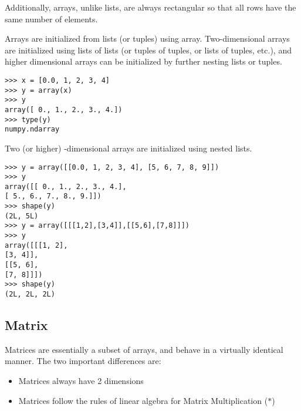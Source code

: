 \documentclass[KSmain.tex]{subfiles}
\begin{document}

Additionally, arrays, unlike lists, are always rectangular so that all rows have the same
number of elements.

Arrays are initialized from lists (or tuples) using array. Two-dimensional arrays are initialized using
lists of lists (or tuples of tuples, or lists of tuples, etc.), and higher dimensional arrays can be initialized by
further nesting lists or tuples.

\begin{framed}
\begin{verbatim}
>>> x = [0.0, 1, 2, 3, 4]
>>> y = array(x)
>>> y
array([ 0., 1., 2., 3., 4.])
>>> type(y)
numpy.ndarray
\end{verbatim}
\end{framed}
Two (or higher) -dimensional arrays are initialized using nested lists.
\begin{framed}
\begin{verbatim}
>>> y = array([[0.0, 1, 2, 3, 4], [5, 6, 7, 8, 9]])
>>> y
array([[ 0., 1., 2., 3., 4.],
[ 5., 6., 7., 8., 9.]])
>>> shape(y)
(2L, 5L)
>>> y = array([[[1,2],[3,4]],[[5,6],[7,8]]])
>>> y
array([[[1, 2],
[3, 4]],
[[5, 6],
[7, 8]]])
>>> shape(y)
(2L, 2L, 2L)
\end{verbatim}
\end{framed}

\subsection{Matrix}
Matrices are essentially a subset of arrays, and behave in a virtually identical manner. The two important
differences are:

\begin{itemize}
\item Matrices always have 2 dimensions
\item Matrices follow the rules of linear algebra for Matrix Multiplication ($\ast$)
\end{itemize}

\newpage
\end{document}
